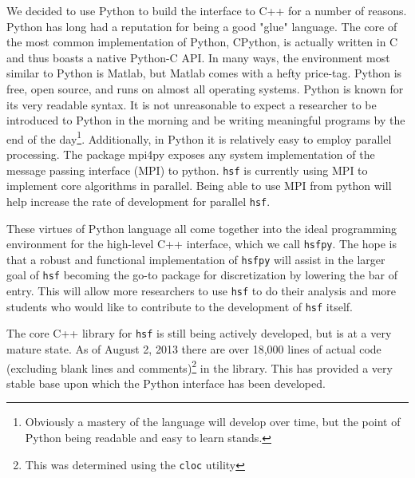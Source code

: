     We decided to use Python to build the interface to C++ for a number of reasons. Python has long had a reputation for being a good "glue" language. The core of the most common implementation of Python, CPython, is actually written in C and thus boasts a native Python-C API. In many ways, the environment most similar to Python is Matlab, but Matlab comes with a hefty price-tag. Python is free, open source, and runs on almost all operating systems. Python is known for its very readable syntax. It is not unreasonable to expect a researcher to be introduced to Python in the morning and be writing meaningful programs by the end of the day\footnote{Obviously a mastery of the language will develop over time, but the point of Python being readable and easy to learn stands.}. Additionally, in Python it is relatively easy to employ parallel processing. The package mpi4py exposes any system implementation of the message passing interface (MPI) to python. \texttt{hsf} is currently using MPI to implement core algorithms in parallel. Being able to use MPI from python will help increase the rate of development for parallel \texttt{hsf}.

    These virtues of Python language all come together into the ideal programming environment for the high-level C++ interface, which we call \texttt{hsfpy}. The hope is that a robust and functional implementation of \texttt{hsfpy} will assist in the larger goal of \texttt{hsf} becoming the go-to package for discretization by lowering the bar of entry. This will allow more researchers to use \texttt{hsf} to do their analysis and more students who would like to contribute to the development of \texttt{hsf} itself.

    The core C++ library for \texttt{hsf} is still being actively developed, but is at a very mature state. As of August 2, 2013 there are over 18,000 lines of actual code (excluding blank lines and comments)\footnote{This was determined using the \texttt{cloc} utility} in the library. This has provided a very stable base upon which the Python interface has been developed.
